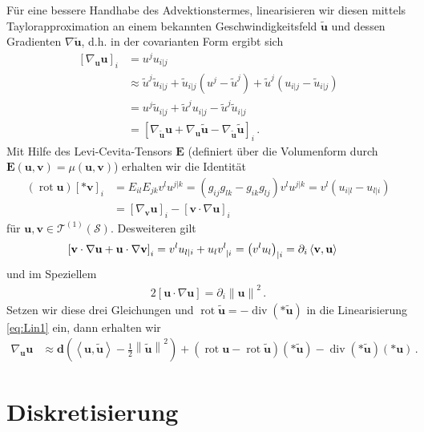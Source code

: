 \documentclass[a4paper,11pt]{scrartcl}
\newcommand{\U}{u} %
\newcommand{\Ub}{\mathbf{\U}} %
\newcommand{\tU}{\tilde{u}} %
\newcommand{\tUb}{\mathbf{\tU}} %
\newcommand{\V}{v} %
\newcommand{\Vb}{\mathbf{\V}} %
\newcommand{\lc}{\mathbf{E}} %
\newcommand{\surf}{\mathcal{S}} %
\newcommand{\uspace}{\mathcal{T}^{(1)}(\surf)} %
\renewcommand{\div}{\operatorname{div}} %
\newcommand{\rot}{\operatorname{rot}} %
\newcommand{\exd}{\mathbf{d}} %
\newcommand{\formPeriod}{\,\text{.}}
\begin{document}
  Für eine bessere Handhabe des Advektionstermes, linearisieren wir diesen mittels Taylorapproximation an einem bekannten Geschwindigkeitsfeld \( \tUb \) und dessen Gradienten 
  \( \nabla\tUb \), d.h. in der covarianten Form ergibt sich
  \begin{align}
     \left[ \nabla_{\Ub}\Ub  \right]_{i} &= \U^{j}\U_{i|j}\\
         &\approx \tU^{j}\tU_{i|j} + \tU_{i|j}\left( \U^{j} - \tU^{j} \right) + \tU^{j}\left( \U_{i|j} - \tU_{i|j} \right) \\
         &= \U^{j}\tU_{i|j} + \tU^{j}\U_{i|j} - \tU^{j}\tU_{i|j} \\
         &= \left[ \nabla_{\tUb}\Ub + \nabla_{\Ub}\tUb - \nabla_{\tUb}\tUb\right]_{i}\formPeriod \label{eq:Lin1}
  \end{align}
  Mit Hilfe des Levi-Cevita-Tensors \( \lc \) (definiert über die Volumenform durch \( \lc(\Ub,\Vb) = \mu(\Ub,\Vb) \)) erhalten wir die Identität
  \begin{align}
    \left( \rot\Ub \right)\left[ *\Vb \right]_{i}
      &= E_{il}E_{jk}\V^{l}\U^{j|k} 
       = \left( g_{ij}g_{lk} - g_{ik}g_{lj} \right)\V^{l}\U^{j|k}
       = \V^{l}\left( \U_{i|l} - \U_{l|i} \right) \\
      &= \left[ \nabla_{\Vb}\Ub \right]_{i} - \left[ \Vb\cdot\nabla\Ub \right]_{i}
  \end{align}
  für \( \Ub,\Vb\in\uspace \).
  Desweiteren gilt
  \begin{align}
    \left[ \Vb\cdot\nabla\Ub + \Ub\cdot\nabla\Vb\right]_{i}
        &= \V^{l}\U_{l|i} + \U_{l}\tensor{\V}{^{l}_{|i}}
         = \left( \V^{l}\U_{l} \right)_{|i} 
         = \partial_{i}\left\langle \Vb, \Ub \right\rangle
  \end{align}
  und im Speziellem 
  \begin{align}
    2\left[ \Ub\cdot\nabla\Ub \right] = \partial_{i}\left\| \Ub \right\|^{2} \formPeriod
  \end{align}
  Setzen wir diese drei Gleichungen und \( \rot\tUb = -\div(*\tUb) \) in die Linearisierung \eqref{eq:Lin1} ein, dann erhalten wir
  \begin{align}\label{eq:Lin2}
    \nabla_{\Ub}\Ub &\approx \exd\left( \left\langle \Ub, \tUb \right\rangle - \frac{1}{2}\left\| \tUb \right\|^{2} \right)
                            +\left( \rot\Ub - \rot\tUb \right)(*\tUb)
                            -\div(*\tUb)(*\Ub) \formPeriod
  \end{align}

\section{Diskretisierung}
\end{document}

